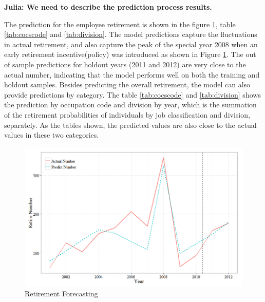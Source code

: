 \documentclass[12pt,letterpaper]{article}
\begin{document}
{\bf Julia: We need to describe the prediction process results.}

The prediction for the employee retirement is shown in the figure \ref{fig:predict}, table \ref{tab:cocscode} and \ref{tab:division}. The model predictions capture the fluctuations in actual retirement, and also capture the peak of the special year 2008 when an early retirement incentive(policy) was introduced as shown in Figure \ref{fig:predict}. The out of sample predictions for holdout years (2011 and 2012) are very close to the actual number, indicating that the model performs well on both the training and holdout samples. Besides predicting the overall retirement, the model can also provide predictions by category. The table \ref{tab:cocscode} and \ref{tab:division} shows the prediction by occupation code and division by year, which is the summation of the retirement probabilities of individuals by job classification and division, separately. As the tables shown, the predicted values are also close to the actual values in these two categories.

\begin{figure}[h!]
	\centering
	\includegraphics[width=5in]{retire2.png}
	\caption{Retirement Forecasting}
	\label{fig:predict}	
	
\end{figure}
\end{document}

